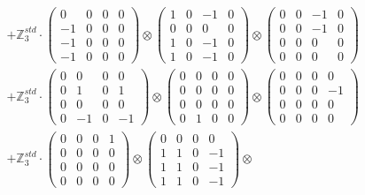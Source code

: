 \documentclass{article}
\begin{document}
{\begin{align}
        &+ \label{Rs16-Rc11-Solution-30-c22} \mathbb{Z}_3^{std} \cdot 
            \begin{pmatrix} 0 & 0 & 0 & 0 \\ -1 & 0 & 0 & 0 \\ -1 & 0 & 0 & 0 \\ -1 & 0 & 0 & 0 \end{pmatrix} \otimes 
            \begin{pmatrix} 1 & 0 & -1 & 0 \\ 0 & 0 & 0 & 0 \\ 1 & 0 & -1 & 0 \\ 1 & 0 & -1 & 0 \end{pmatrix} \otimes 
            \begin{pmatrix} 0 & 0 & -1 & 0 \\ 0 & 0 & -1 & 0 \\ 0 & 0 & 0 & 0 \\ 0 & 0 & 0 & 0 \end{pmatrix} \\ 
        &+ \label{Rs16-Rc11-Solution-30-c23} \mathbb{Z}_3^{std} \cdot 
            \begin{pmatrix} 0 & 0 & 0 & 0 \\ 0 & 1 & 0 & 1 \\ 0 & 0 & 0 & 0 \\ 0 & -1 & 0 & -1 \end{pmatrix} \otimes 
            \begin{pmatrix} 0 & 0 & 0 & 0 \\ 0 & 0 & 0 & 0 \\ 0 & 0 & 0 & 0 \\ 0 & 1 & 0 & 0 \end{pmatrix} \otimes 
            \begin{pmatrix} 0 & 0 & 0 & 0 \\ 0 & 0 & 0 & -1 \\ 0 & 0 & 0 & 0 \\ 0 & 0 & 0 & 0 \end{pmatrix} \\ 
        &+ \label{Rs16-Rc11-Solution-30-c24} \mathbb{Z}_3^{std} \cdot 
            \begin{pmatrix} 0 & 0 & 0 & 1 \\ 0 & 0 & 0 & 0 \\ 0 & 0 & 0 & 0 \\ 0 & 0 & 0 & 0 \end{pmatrix} \otimes 
            \begin{pmatrix} 0 & 0 & 0 & 0 \\ 1 & 1 & 0 & -1 \\ 1 & 1 & 0 & -1 \\ 1 & 1 & 0 & -1 \end{pmatrix} \otimes 

\end{align}}
\end{document}
